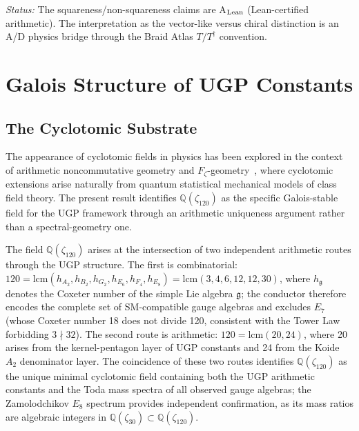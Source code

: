 \documentclass[11pt]{article}
\theoremstyle{remark}
\newcommand{\zetaN}[1]{\zeta_{#1}}
\begin{document}
\noindent\textit{Status:} The squareness/non-squareness claims are A$_{\rm Lean}$ (Lean-certified arithmetic).  The interpretation as the vector-like versus chiral distinction is an A/D physics bridge through the Braid Atlas $T/T^\dagger$ convention.

\section{Galois Structure of UGP Constants}
\label{sec:galois}

\subsection{The Cyclotomic Substrate}

The appearance of cyclotomic fields in physics has been explored in the context
of arithmetic noncommutative geometry and $F_\zeta$-geometry~\cite{MarcolliManin2020},
where cyclotomic extensions arise naturally from quantum statistical mechanical
models of class field theory.  The present result identifies $\mathbb{Q}(\zetaN{120})$
as the specific Galois-stable field for the UGP framework through an arithmetic
uniqueness argument rather than a spectral-geometry one.

The field $\mathbb{Q}(\zetaN{120})$ arises at the intersection of two independent
arithmetic routes through the UGP structure.
The first is combinatorial:
$120 = \mathrm{lcm}(h_{A_2}, h_{B_2}, h_{G_2}, h_{E_6}, h_{F_4}, h_{E_8})
     = \mathrm{lcm}(3, 4, 6, 12, 12, 30)$,
where $h_{\mathfrak{g}}$ denotes the Coxeter number of the simple Lie algebra
$\mathfrak{g}$; the conductor therefore encodes the complete set of SM-compatible
gauge algebras and excludes $E_7$ (whose Coxeter number 18 does not divide 120,
consistent with the Tower Law forbidding $3 \nmid 32$).
The second route is arithmetic: $120 = \mathrm{lcm}(20, 24)$, where 20 arises from
the kernel-pentagon layer of UGP constants and 24 from the Koide $A_2$ denominator
layer.
The coincidence of these two routes identifies $\mathbb{Q}(\zetaN{120})$ as the
unique minimal cyclotomic field containing both the UGP arithmetic constants and the
Toda mass spectra of all observed gauge algebras; the Zamolodchikov $E_8$ spectrum
provides independent confirmation, as its mass ratios are algebraic integers in
$\mathbb{Q}(\zetaN{30}) \subset \mathbb{Q}(\zetaN{120})$.
\end{document}

